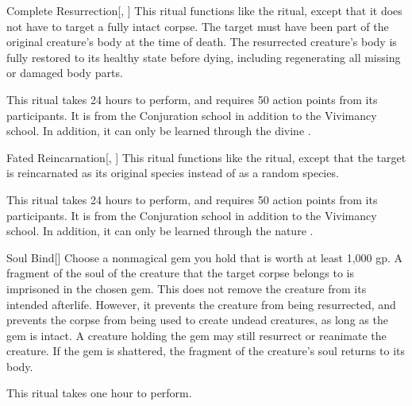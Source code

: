 \lowercase{\hypertarget{spell:Complete Resurrection}{}}\label{spell:Complete Resurrection}
\begin{apability}[Rank 6]{\hypertarget{spell:Complete Resurrection}{Complete Resurrection}}[, ]
This ritual functions like the  ritual, except that it does not have to target a fully intact corpse.
The target must have been part of the original creature's body at the time of death.
The resurrected creature's body is fully restored to its healthy state before dying, including regenerating all missing or damaged body parts.

This ritual takes 24 hours to perform, and requires 50 action points from its participants.
It is from the Conjuration school in addition to the Vivimancy school.
In addition, it can only be learned through the divine .
\end{apability}
\vspace{0.25em}



\lowercase{\hypertarget{spell:Fated Reincarnation}{}}\label{spell:Fated Reincarnation}
\begin{apability}[Rank 6]{\hypertarget{spell:Fated Reincarnation}{Fated Reincarnation}}[, ]
This ritual functions like the  ritual, except that the target is reincarnated as its original species instead of as a random species.

This ritual takes 24 hours to perform, and requires 50 action points from its participants.
It is from the Conjuration school in addition to the Vivimancy school.
In addition, it can only be learned through the nature .
\end{apability}
\vspace{0.25em}



\lowercase{\hypertarget{spell:Soul Bind}{}}\label{spell:Soul Bind}
\begin{apability}[Rank 6]{\hypertarget{spell:Soul Bind}{Soul Bind}}[]
Choose a nonmagical gem you hold that is worth at least 1,000 gp.
A fragment of the soul of the creature that the target corpse belongs to is imprisoned in the chosen gem.
This does not remove the creature from its intended afterlife.
However, it prevents the creature from being resurrected, and prevents the corpse from being used to create undead creatures, as long as the gem is intact.
A creature holding the gem may still resurrect or reanimate the creature.
If the gem is shattered, the fragment of the creature's soul returns to its body.

This ritual takes one hour to perform.
\end{apability}
\vspace{0.25em}



